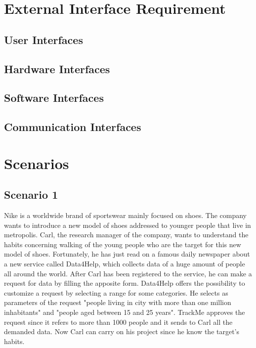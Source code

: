 \section{External Interface Requirement}
\subsection{User Interfaces}
\par
\par
\par
\par
\par
\subsection{Hardware Interfaces}
\subsection{Software Interfaces}
\subsection{Communication Interfaces}

\section{Scenarios}
    \subsection{Scenario 1}
    Nike is a worldwide brand of sportswear mainly focused on shoes. The company wants to introduce a new model of shoes addressed to younger people that live in metropolis. Carl, the research manager of the company, wants to understand the habits concerning walking of the young people who are the target for this new model of shoes.
    Fortunately, he has just read on a famous daily newspaper about a new service called Data4Help, which collects data of a huge amount of people all around the world. After Carl has been registered to the service, he can make a request for data by filling the apposite form. Data4Help offers the possibility to customize a request by selecting a range for some categories. He selects as parameters of the request "people living in city with more than one million inhabitants" and "people aged between 15 and 25 years".
    TrackMe approves the request since it refers to more than 1000 people and it sends to Carl all the demanded data.
    Now Carl can carry on his project since he know the target's habits.

